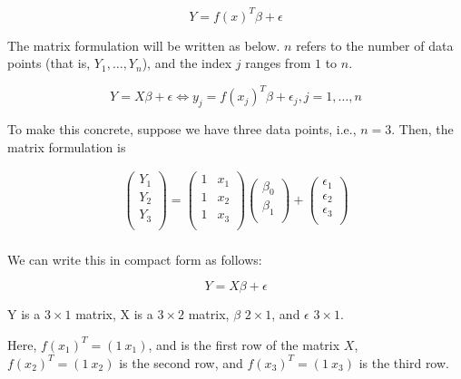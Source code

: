 \documentclass[
  12pt,
]{krantz}
\theoremstyle{definition}
\theoremstyle{definition}
\theoremstyle{definition}
\theoremstyle{definition}
\theoremstyle{remark}
\begin{document}
\begin{equation}
Y=f(x)^T\beta +\epsilon 
\end{equation}

The matrix formulation will be written as below. \(n\) refers to the number of data points (that is, \(Y_1,\dots,Y_n\)), and the index \(j\) ranges from \(1\) to \(n\).

\begin{equation}
Y = X\beta + \epsilon \Leftrightarrow y_j = f(x_j)^T \beta + \epsilon_j, j=1,\dots,n
\end{equation}

To make this concrete, suppose we have three data points, i.e., \(n=3\). Then, the matrix formulation is

\begin{equation}
\begin{split}
\begin{pmatrix}
Y_1 \\
Y_2\\
Y_3 \\
\end{pmatrix}
=
\begin{pmatrix}
1 & x_1 \\
1 & x_2 \\
1 & x_3 \\
\end{pmatrix}
\begin{pmatrix}
\beta_0 \\
\beta_1 \\
\end{pmatrix}+ 
\begin{pmatrix}
\epsilon_1 \\
\epsilon_2 \\
\epsilon_3 \\
\end{pmatrix}\\
\end{split}
\end{equation}

We can write this in compact form as follows:

\begin{equation}
Y = X \beta + \epsilon
\end{equation}

Y is a \(3\times 1\) matrix, X is a \(3\times 2\) matrix, \(\beta\) \(2\times 1\), and \(\epsilon\) \(3\times 1\).

Here, \(f(x_1)^T = (1~x_1)\), and is the first row of the matrix \(X\),
\(f(x_2)^T = (1~x_2)\) is the second row, and
\(f(x_3)^T = (1~x_3)\) is the third row.
\end{document}
